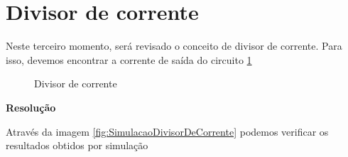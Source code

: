 \section{Divisor de corrente}

Neste terceiro momento, será revisado o conceito de divisor de corrente. Para isso, devemos encontrar a corrente de saída do circuito \ref{fig:DivisorDeCorrente}

\begin{figure}[H]
    \centering
    \caption{Divisor de corrente}
    \vspace{-0.3cm}
    \label{fig:DivisorDeCorrente}
\end{figure}

\noindent
\textbf{Resolução}

\begin{Resolucao}[H]
    \label{res:UmaMalha}
\end{Resolucao}

Através da imagem \ref{fig:SimulacaoDivisorDeCorrente} podemos verificar os resultados obtidos por simulação

